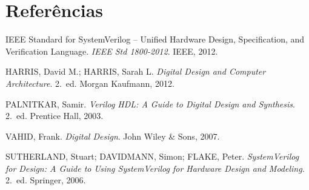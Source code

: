 \documentclass[12pt,a4paper]{article}
\begin{document}
\section*{Referências}

\begin{enumerate}[leftmargin=1.5cm, label={[\arabic*]}]
  \item IEEE Standard for SystemVerilog -- Unified Hardware Design, Specification,
        and Verification Language. \textit{IEEE Std 1800-2012}. IEEE, 2012.
  \item HARRIS, David M.; HARRIS, Sarah L. \textit{Digital Design and Computer
        Architecture}. 2.\ ed. Morgan Kaufmann, 2012.
  \item PALNITKAR, Samir. \textit{Verilog HDL: A Guide to Digital Design and
        Synthesis}. 2.\ ed. Prentice Hall, 2003.
  \item VAHID, Frank. \textit{Digital Design}. John Wiley \& Sons, 2007.
  \item SUTHERLAND, Stuart; DAVIDMANN, Simon; FLAKE, Peter. \textit{SystemVerilog
        for Design: A Guide to Using SystemVerilog for Hardware Design and Modeling}.
        2.\ ed. Springer, 2006.
\end{enumerate}
\end{document}
